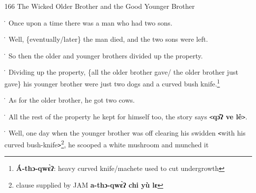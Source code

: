 
166 The Wicked Older Brother and the Good Younger Brother

\. Once upon a time there was a man who had two sons.

\. Well, \{eventually/later\} the man died, and the two sons were left.

\. So then the older and younger brothers divided up the property.

\. Dividing up the property, \{all the older brother gave/ the older brother just
gave\} his younger brother were just two dogs and a curved bush knife.\footnote{\textbf{Á-thɔ-qwɛ̀ʔ}: heavy curved knife/machete used to cut undergrowth}

\. As for the older brother, he got two cows.

\. All the rest of the property he kept for himself too, the story says \texttt{<}\textbf{qɔ̂ʔ
ve lê}\texttt{>}.

\. Well, one day when the younger brother was off clearing his swidden \texttt{<}with
his curved bush-knife\texttt{>}\footnote{clause supplied by JAM \textbf{a-thɔ-qwɛ̀ʔ chi yù lɛ }}, he scooped a white mushroom and munched it
